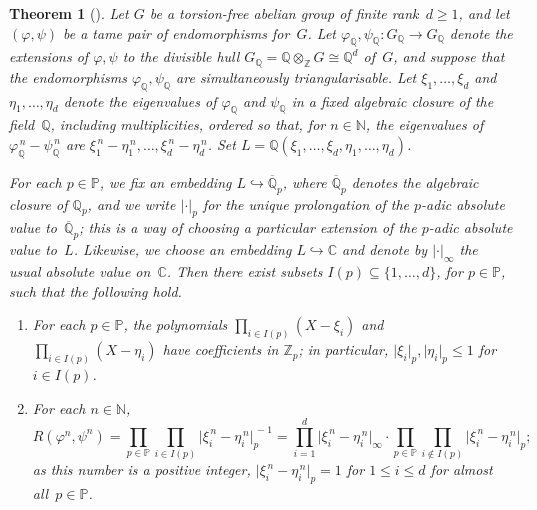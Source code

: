 \documentclass[oneside]{amsart}
\newtheorem{thm}{Theorem}
\begin{document}
\begin{thm}[] \label{thm:FelsKlop-3.4}
  Let $G$ be a torsion-free abelian group of finite rank~$d\geq 1$,
  and let $(\varphi,\psi)$ be a tame pair of endomorphisms for~$G$.
  Let $\varphi_\mathbb{Q}, \psi_\mathbb{Q} \colon G_\mathbb{Q} \to
  G_\mathbb{Q}$ denote the extensions of $\varphi, \psi$ to the
  divisible hull $G_\mathbb{Q} = \mathbb{Q} \otimes_\mathbb{Z} G \cong \mathbb{Q}^d$
  of~$G$, and suppose that the endomorphisms
  $\varphi_\mathbb{Q}, \psi_\mathbb{Q}$ are simultaneously
  triangularisable.  Let $\xi_1, \ldots, \xi_d$ and
  $\eta_1, \ldots, \eta_d$ denote the eigenvalues of
  $\varphi_\mathbb{Q}$ and $\psi_\mathbb{Q}$ in a fixed algebraic
  closure of the field~$\mathbb{Q}$, including multiplicities,
  ordered so that, for $n \in \mathbb{N}$, the eigenvalues of
  $\varphi_\mathbb{Q}^{\, n} - \psi_\mathbb{Q}^{\, n}$ are
  $\xi_1^{\, n} - \eta_1^{\, n}, \ldots, \xi_d^{\, n} - \eta_d^{\,
    n}$.  Set
  $L = \mathbb{Q}(\xi_1, \ldots, \xi_d, \eta_1, \ldots, \eta_d)$.

  For each $p \in \mathbb{P}$, we fix an embedding
  $L \hookrightarrow \overline{\mathbb{Q}}_p$, where
  $\overline{\mathbb{Q}}_p$ denotes the algebraic closure of
  $\mathbb{Q}_p$, and we write $\lvert \cdot \rvert_p$ for the unique
  prolongation of the $p$-adic absolute value
  to~$\overline{\mathbb{Q}}_p$; this is a way of choosing a particular
  extension of the $p$-adic absolute value to~$L$.  Likewise, we
  choose an embedding $L \hookrightarrow \mathbb{C}$ and denote by
  $\lvert \cdot \rvert_\infty$ the usual absolute value
  on~$\mathbb{C}$.
    \smallskip
    Then there exist subsets $I(p) \subseteq \{1,\ldots,d\}$, for
  $p \in \mathbb{P}$, such that the following hold.
  \begin{enumerate}
  \item[$(1)$] For each $p \in \mathbb{P}$, the polynomials
    $\prod_{i \in I(p)} (X - \xi_i)$ and
    $\prod_{i \in I(p)} (X - \eta_i)$ have coefficients in
    $\mathbb{Z}_p$; in particular,
    $\lvert \xi_i \rvert_p , \lvert \eta_i \rvert_p \le 1$ for
    $i \in I(p)$.
  \item[$(2)$] For each $n \in \mathbb{N}$,
  \begin{equation} \label{eq:Reidemeister-coincidence-product-eigenvalues}
    R(\varphi^n,\psi^n) = \prod_{p \in \mathbb{P}} \prod_{i \in I(p)}
    \lvert \xi_i^{\, n} - \eta_i^{\, n} \rvert_p^{\, -1} =
    \prod_{i=1}^d \lvert \xi_i^{\, n} - \eta_i^{\, n} \rvert_\infty \cdot
    \prod_{p \in \mathbb{P}} \prod_{i \not \in I(p)} \lvert \xi_i^{\, n} -
    \eta_i^{\, n} \rvert_p;
  \end{equation}
    as this number is a positive integer,
    $\lvert \xi_i^{\, n} - \eta_i^{\, n} \rvert_p = 1$ for
    $1 \le i \le d$ for almost all~$p \in \mathbb{P}$.
  \end{enumerate}
\end{thm}
\end{document}
